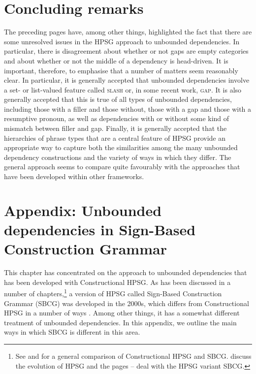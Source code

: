 \documentclass[output=paper
,notxmath 
 	        ,biblatex
                ,babelshorthands
                ,newtxmath
                ,draftmode
                ,colorlinks, citecolor=brown
]{langscibook}
\begin{document}
\section{Concluding remarks}
\label{sec:UDC:ConcludingRemarks}

The preceding pages have, among other things, highlighted the fact
that there are some unresolved issues in the HPSG approach to
unbounded dependencies. In particular, there is disagreement about
whether or not gaps are empty categories and about whether or not the
middle of a dependency is head-driven. It is important, therefore, to
emphasise that a number of matters seem reasonably clear. In
particular, it is generally accepted that unbounded dependencies
involve a set- or list-valued feature called \textsc{slash} or, in
some recent work, \textsc{gap}. It is also generally accepted that
this is true of all types of unbounded dependencies, including those
with a filler and those without, those with a gap and those with a
resumptive pronoun, as well as dependencies with or without some kind
of mismatch between filler and gap. Finally, it is generally accepted
that the hierarchies of phrase types that are a central feature of
HPSG provide an appropriate way to capture both the similarities among
the many unbounded dependency constructions and the variety of ways in
which they differ. The general approach seems to compare quite
favourably with the approaches that have been developed within other
frameworks.

\section*{Appendix: Unbounded dependencies in Sign-Based Construction Grammar}
\label{udc:sec-SBCG}

This chapter has concentrated on the approach to unbounded
dependencies that has been developed with Constructional HPSG. As
has been discussed in a number of chapters,\footnote{
{See  and  for a general comparison of
  Constructional HPSG and SBCG. \citet{chapters/evolution} discuss the
  evolution of HPSG and the pages \pageref{page-sbcg-start}--\pageref{page-sbcg-end} deal with the
  HPSG variant SBCG.}
} a version of HPSG called
Sign-Based Construction Grammar (SBCG) was developed in the 2000s,
which differs from Constructional HPSG in a number of ways
\citep{Sag:12}. Among other things, it has a somewhat different
treatment of unbounded dependencies. In this appendix, we outline the
main ways in which SBCG is different in this area.
\end{document}
